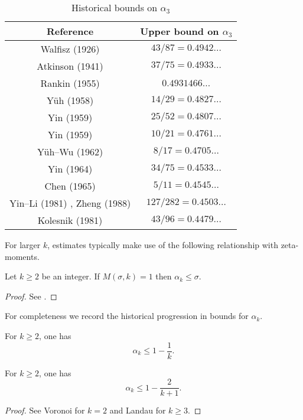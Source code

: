 \begin{table}[ht]
    \def\arraystretch{1.2}
    \centering
    \caption{Historical bounds on $\alpha_3$}
    \begin{tabular}{|c|c|}
    \hline
    Reference & Upper bound on $\alpha_3$\\
    \hline
    Walfisz (1926) \cite{walfisz_uber_1926} & $43/87 = 0.4942\ldots$\\
    \hline
    Atkinson (1941) \cite{atkinson_divisor_1941} & $37/75 = 0.4933\ldots$\\
    \hline
    Rankin (1955) \cite{rankin_van_1955} & $0.4931466\ldots$\\
    \hline
    Y\"{u}h (1958) \cite{yuh_divisor_1958} & $14/29 = 0.4827\ldots$\\
    \hline 
    Yin (1959) \cite{Yin_divisor_25_52} & $25/52 = 0.4807\ldots$\\
    \hline 
    Yin (1959) \cite{Yin_divisor_10_21} & $10/21 = 0.4761\ldots$\\
    \hline
    Y\"{u}h--Wu (1962) \cite{yuh_wu_divisor_1962} & $8/17 = 0.4705\ldots$\\
    \hline 
    Yin (1964) \cite{Yin_divisor_34_75} & $34/75 = 0.4533\ldots$\\
    \hline
    Chen (1965) \cite{chen_divisor_1965} & $5/11 = 0.4545\ldots$\\
    \hline
    Yin--Li (1981) \cite{Yin-Li_divisor_127_282}, Zheng (1988) \cite{Zheng_divisor_127_282} & $127/282 = 0.4503\ldots$\\
    \hline
    Kolesnik (1981) \cite{kolesnik} & $43/96 = 0.4479\ldots$\\
    \hline
    \end{tabular}
\label{div-alpha3-table}
\end{table}


For larger $k$, estimates typically make use of the following relationship with zeta-moments. 

\begin{lemma}\label{mas}  Let $k \geq 2$ be an integer. If $M(\sigma,k) = 1$ then $\alpha_k \leq \sigma$.
\end{lemma}

\begin{proof}  See \cite[\S 13.3]{ivic}.
\end{proof}

For completeness we record the historical progression in bounds for $\alpha_k$.  
\begin{lemma}\label{piltz-alpha}
For $k \ge 2$, one has
\[
\alpha_k \le 1 - \frac{1}{k}.
\]
\end{lemma}
\begin{lemma}\label{voronoi-alpha}
For $k \ge 2$, one has
\[
\alpha_k \leq 1 - \frac{2}{k + 1}.
\]
\end{lemma}
\begin{proof}
See Voronoi \cite{voronoi_sur_1903} for $k = 2$ and Landau \cite{landau_uber_1912} for $k \ge 3$. 
\end{proof}

